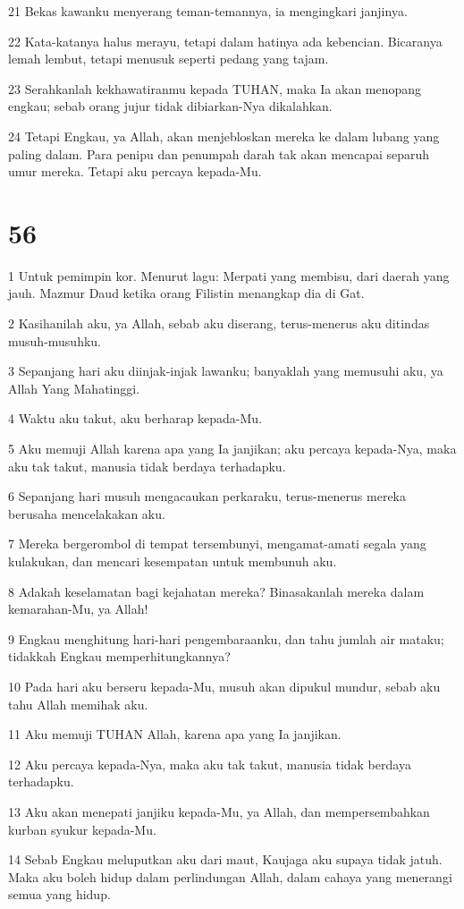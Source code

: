 \par 21 Bekas kawanku menyerang teman-temannya, ia mengingkari janjinya.
\par 22 Kata-katanya halus merayu, tetapi dalam hatinya ada kebencian. Bicaranya lemah lembut, tetapi menusuk seperti pedang yang tajam.
\par 23 Serahkanlah kekhawatiranmu kepada TUHAN, maka Ia akan menopang engkau; sebab orang jujur tidak dibiarkan-Nya dikalahkan.
\par 24 Tetapi Engkau, ya Allah, akan menjebloskan mereka ke dalam lubang yang paling dalam. Para penipu dan penumpah darah tak akan mencapai separuh umur mereka. Tetapi aku percaya kepada-Mu.

\chapter{56}

\par 1 Untuk pemimpin kor. Menurut lagu: Merpati yang membisu, dari daerah yang jauh. Mazmur Daud ketika orang Filistin menangkap dia di Gat.
\par 2 Kasihanilah aku, ya Allah, sebab aku diserang, terus-menerus aku ditindas musuh-musuhku.
\par 3 Sepanjang hari aku diinjak-injak lawanku; banyaklah yang memusuhi aku, ya Allah Yang Mahatinggi.
\par 4 Waktu aku takut, aku berharap kepada-Mu.
\par 5 Aku memuji Allah karena apa yang Ia janjikan; aku percaya kepada-Nya, maka aku tak takut, manusia tidak berdaya terhadapku.
\par 6 Sepanjang hari musuh mengacaukan perkaraku, terus-menerus mereka berusaha mencelakakan aku.
\par 7 Mereka bergerombol di tempat tersembunyi, mengamat-amati segala yang kulakukan, dan mencari kesempatan untuk membunuh aku.
\par 8 Adakah keselamatan bagi kejahatan mereka? Binasakanlah mereka dalam kemarahan-Mu, ya Allah!
\par 9 Engkau menghitung hari-hari pengembaraanku, dan tahu jumlah air mataku; tidakkah Engkau memperhitungkannya?
\par 10 Pada hari aku berseru kepada-Mu, musuh akan dipukul mundur, sebab aku tahu Allah memihak aku.
\par 11 Aku memuji TUHAN Allah, karena apa yang Ia janjikan.
\par 12 Aku percaya kepada-Nya, maka aku tak takut, manusia tidak berdaya terhadapku.
\par 13 Aku akan menepati janjiku kepada-Mu, ya Allah, dan mempersembahkan kurban syukur kepada-Mu.
\par 14 Sebab Engkau meluputkan aku dari maut, Kaujaga aku supaya tidak jatuh. Maka aku boleh hidup dalam perlindungan Allah, dalam cahaya yang menerangi semua yang hidup.

